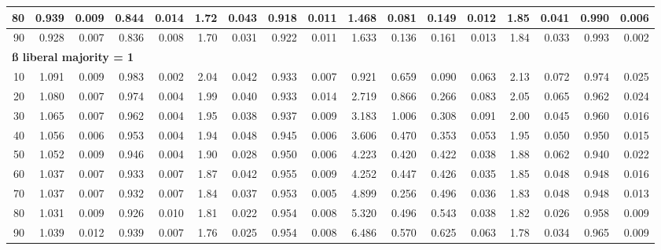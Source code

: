\documentclass[
]{article}
\begin{document}
\begin{table}[H]
\begin{table}
{\begin{tabular}{r|r|r|r|r|r|r|r|r|r|r|r|r|r|r|r|r}
\hline
\hspace{1em}80 & 0.939 & 0.009 & 0.844 & 0.014 & 1.72 & 0.043 & 0.918 & 0.011 & 1.468 & 0.081 & 0.149 & 0.012 & 1.85 & 0.041 & 0.990 & 0.006\\
\hline
\hspace{1em}90 & 0.928 & 0.007 & 0.836 & 0.008 & 1.70 & 0.031 & 0.922 & 0.011 & 1.633 & 0.136 & 0.161 & 0.013 & 1.84 & 0.033 & 0.993 & 0.002\\
\hline
\multicolumn{17}{l}{\textbf{ß liberal majority = 1}}\\
\hline
\hspace{1em}10 & 1.091 & 0.009 & 0.983 & 0.002 & 2.04 & 0.042 & 0.933 & 0.007 & 0.921 & 0.659 & 0.090 & 0.063 & 2.13 & 0.072 & 0.974 & 0.025\\
\hline
\hspace{1em}20 & 1.080 & 0.007 & 0.974 & 0.004 & 1.99 & 0.040 & 0.933 & 0.014 & 2.719 & 0.866 & 0.266 & 0.083 & 2.05 & 0.065 & 0.962 & 0.024\\
\hline
\hspace{1em}30 & 1.065 & 0.007 & 0.962 & 0.004 & 1.95 & 0.038 & 0.937 & 0.009 & 3.183 & 1.006 & 0.308 & 0.091 & 2.00 & 0.045 & 0.960 & 0.016\\
\hline
\hspace{1em}40 & 1.056 & 0.006 & 0.953 & 0.004 & 1.94 & 0.048 & 0.945 & 0.006 & 3.606 & 0.470 & 0.353 & 0.053 & 1.95 & 0.050 & 0.950 & 0.015\\
\hline
\hspace{1em}50 & 1.052 & 0.009 & 0.946 & 0.004 & 1.90 & 0.028 & 0.950 & 0.006 & 4.223 & 0.420 & 0.422 & 0.038 & 1.88 & 0.062 & 0.940 & 0.022\\
\hline
\hspace{1em}60 & 1.037 & 0.007 & 0.933 & 0.007 & 1.87 & 0.042 & 0.955 & 0.009 & 4.252 & 0.447 & 0.426 & 0.035 & 1.85 & 0.048 & 0.948 & 0.016\\
\hline
\hspace{1em}70 & 1.037 & 0.007 & 0.932 & 0.007 & 1.84 & 0.037 & 0.953 & 0.005 & 4.899 & 0.256 & 0.496 & 0.036 & 1.83 & 0.048 & 0.948 & 0.013\\
\hline
\hspace{1em}80 & 1.031 & 0.009 & 0.926 & 0.010 & 1.81 & 0.022 & 0.954 & 0.008 & 5.320 & 0.496 & 0.543 & 0.038 & 1.82 & 0.026 & 0.958 & 0.009\\
\hline
\hspace{1em}90 & 1.039 & 0.012 & 0.939 & 0.007 & 1.76 & 0.025 & 0.954 & 0.008 & 6.486 & 0.570 & 0.625 & 0.063 & 1.78 & 0.034 & 0.965 & 0.009\\

\end{tabular}}
\end{table}
\end{table}
\end{document}
